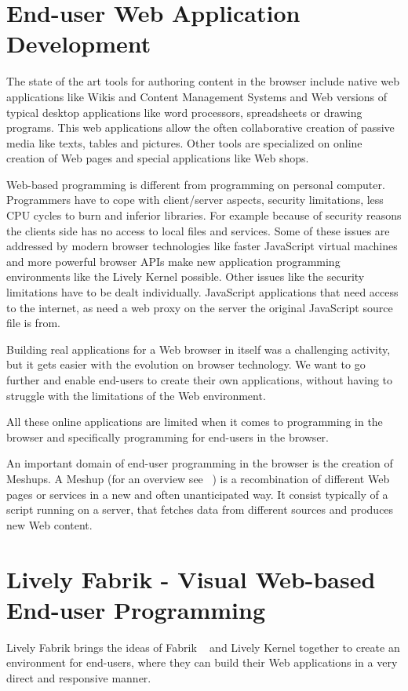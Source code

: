 \documentclass[pdftex, times, 10pt, twocolumn]{article}
\begin{document}
\section{End-user Web Application Development}
The state of the art tools for authoring content in the browser include native web applications like Wikis and Content Management Systems and Web versions of typical desktop applications like word processors, spreadsheets or drawing programs. This web applications allow the often collaborative creation of passive media like texts, tables and pictures. Other tools are specialized on online creation of Web pages and special applications like Web shops.  

Web-based programming is different from programming on personal computer. Programmers have to cope with client/server aspects, security limitations, less CPU cycles to burn and inferior libraries. For example because of  security reasons the clients side has no access to local files and services.  Some of these issues are addressed by modern browser technologies like faster JavaScript virtual machines and more powerful browser APIs make new application programming environments like the Lively Kernel possible. Other issues like the security limitations have to be dealt individually. JavaScript applications that need access to the internet, as need a web proxy on the server the original JavaScript source file is from.   

Building real applications for a Web browser in itself was a challenging activity, but it gets easier with the evolution on browser technology. We want to go further and enable end-users to create their own applications, without having to struggle with the limitations of the Web environment. 

All these online applications are limited when it comes to programming in the browser and specifically programming for end-users in the browser.  

An important domain of end-user programming in the browser is the creation of Meshups.  A Meshup (for an overview see ~\cite{Merrill2006MNB}) is a recombination of different Web pages or services in a new and often unanticipated way. It consist typically of a script running on a server, that fetches data from different sources and produces new Web content.  



\section{Lively Fabrik - Visual Web-based End-user Programming}
Lively Fabrik brings the ideas of Fabrik ~\cite{Ingalls1988FVP,Ludolph1988FPE} and Lively Kernel together to create an environment for end-users, where they can build their Web applications in a very direct and responsive manner.  
\end{document}
